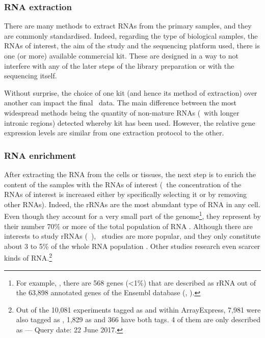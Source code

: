 \subsubsection{\gls{RNA} extraction}

There are many methods to extract \glspl{RNA} from the primary samples, and they
are commonly standardised. Indeed, regarding the type of biological samples,
the \glspl{RNA} of interest, the aim of the  study and the sequencing platform
used, there is one (or more) available commercial kit. These are designed in
a way to not interfere
with any of the later steps of the library preparation or with the sequencing
itself.\mybr\

Without surprise, the choice of one kit (and hence its method of extraction)
over another can impact the final \Rnaseq\ data. The main difference between
the most widespread methods being the quantity of non-mature \glspl{RNA}
(\ie\ with longer intronic regions) detected whereby kit has been used.
However, the relative gene expression levels are similar from one extraction
protocol to the other. \mybr\


\subsubsection{\gls{RNA} enrichment}

After extracting the \gls{RNA} from the cells or tissues,
the next step is to enrich the content of the samples with the \glspl{RNA}
of interest (\ie\ the concentration of the \glspl{RNA} of interest is increased
either by specifically selecting it or by removing other \glspl{RNA}). Indeed,
the \glspl{rRNA} are the most abundant type of \gls{RNA} in any cell. Even
though they account for a very small part of the genome\footnote{For example,
, there are 568 genes (<1\%) that are described as
\gls{rRNA} out of the 63,898 annotated genes of the \gls{Ensembl} database
(, ).}, they represent by their number 70\% or more of
the total population of \gls{RNA} .
Although there are interests to study \glspl{rRNA} (\eg{}~\cite{rrnaStudy}),
\mRNAs\ studies are more popular,
and they only constitute about 3 to 5\% of the whole \gls{RNA} population
. Other studies research even scarcer kinds of
\gls{RNA}.\footnote{Out of the 10,081 experiments tagged as  and  within \gls{ArrayExpress},
7,981 were also tagged as ,
1,829 as  and 366 have both tags.
4 of them are only described as  --- Query date: 22 June 2017.}\mybr\

